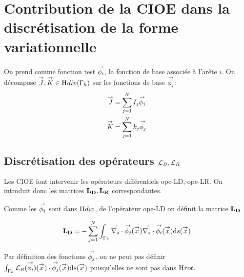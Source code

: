 
\section{Contribution de la CIOE dans la discrétisation de la forme variationnelle}


  On prend comme fonction test \(\phii\), la fonction de base associée à l'arête \(i\).
  On décompose \(\vJ,\vK \in \Hdiv(\Gamma_h)\) sur les fonctions de base \(\phij\):
    \begin{align*}
      \vJ & = \sum_{j=1}^N I_j \phij\\
      \vK & = \sum_{j=1}^N k_j \phij
    \end{align*}

  \subsection[Discrétisation des opérateurs LD, LR]{Discrétisation des opérateurs \(\LD,\LR\)}
    Les CIOE font intervenir les opérateurs différentiels \gls{ope-LD}, \gls{ope-LR}. On introduit donc les matrices \(\mLD,\mLR\) correspondantes.

    Comme les \(\phij\) sont dans \(\Hdiv\), de l'opérateur \gls{ope-LD} on définit la matrice \(\mLD\)
    \begin{defn}
      \begin{align*}
          \mLD = - \sum_{j=1}^N \int_{\Gamma_h} \vdivs \phij(\vx) \vdivs \phii(\vx) \dd{s}(\vx)
      \end{align*}
    \end{defn}
    Par définition des fonctions \(\phij\), on ne peut pas définir \( \int_{\Gamma_h} \LR(\phii)(\vx) \cdot \phij(\vx) \dd{s}(\vx)\) puisqu'elles ne sont pas dans \(\Hrot\).

